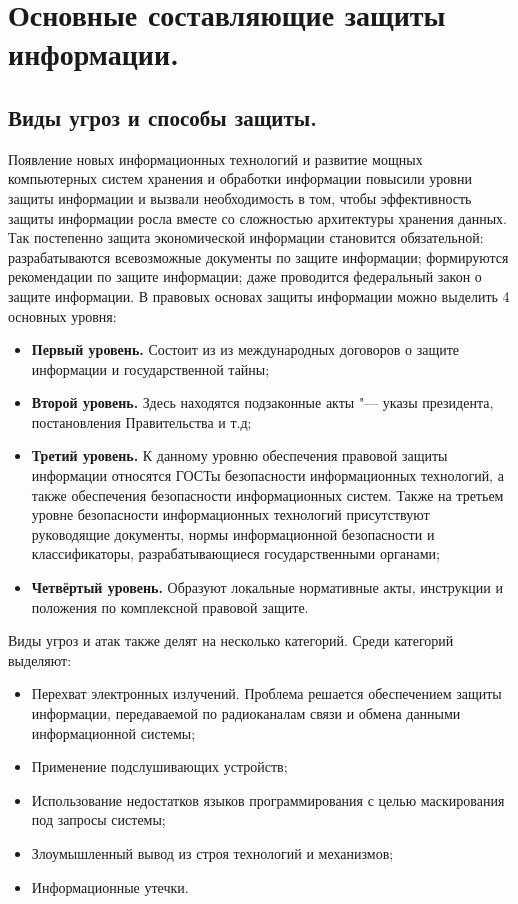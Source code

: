 \section{Основные составляющие защиты информации.}
\subsection{Виды угроз и способы защиты.}
Появление новых информационных технологий и развитие мощных компьютерных систем хранения и обработки информации повысили уровни защиты информации и вызвали 
необходимость в том, чтобы эффективность защиты информации росла вместе со сложностью архитектуры хранения данных. Так постепенно защита экономической информации 
становится обязательной: разрабатываются всевозможные документы по защите информации; формируются рекомендации по защите информации; даже проводится федеральный закон 
о защите информации. В правовых основах защиты информации можно выделить 4 основных уровня:
\begin{itemize}
    \item \textbf{Первый уровень.} Состоит из из международных договоров о защите информации и государственной тайны;
    \item \textbf{Второй уровень.} Здесь находятся подзаконные акты "--- указы президента, постановления Правительства и т.д;
    \item \textbf{Третий уровень.} К данному уровню обеспечения правовой защиты информации относятся ГОСТы безопасности информационных технологий, а также обеспечения безопасности информационных систем.
    Также на третьем уровне безопасности информационных технологий присутствуют руководящие документы, нормы информационной безопасности и классификаторы, разрабатывающиеся 
    государственными органами;
    \item \textbf{Четвёртый уровень.} Образуют локальные нормативные акты, инструкции и положения по комплексной правовой защите.\cite{def_inf}
\end{itemize}
Виды угроз и атак также делят на несколько категорий. Среди категорий выделяют:
\begin{itemize}
    \item Перехват электронных излучений. Проблема решается обеспечением защиты информации, передаваемой по радиоканалам связи и обмена данными 
    информационной системы;
    \item Применение подслушивающих устройств;
    \item Использование недостатков языков программирования с целью маскирования под запросы системы;
    \item Злоумышленный вывод из строя технологий и механизмов;
    \item Информационные утечки.
\end{itemize}

